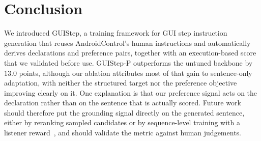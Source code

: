 \documentclass[runningheads,a4paper]{llncs}
\begin{document}
\section{Conclusion}
\label{sec:conclusion}

We introduced GUIStep, a training framework for GUI step instruction generation that reuses
AndroidControl's human instructions and automatically derives declarations and preference pairs,
together with an execution-based score that we validated before use. GUIStep-P outperforms the
untuned backbone by $13.0$ points, although our ablation attributes most of that gain to
sentence-only adaptation, with neither the structured target nor the preference objective
improving clearly on it. One explanation is that our preference signal acts on the declaration
rather than on the sentence that is actually scored. Future work should therefore put the
grounding signal directly on the generated sentence, either by reranking sampled candidates or by
sequence-level training with a listener reward~\cite{scst,luodisc}, and should validate the
metric against human judgements.
\end{document}
